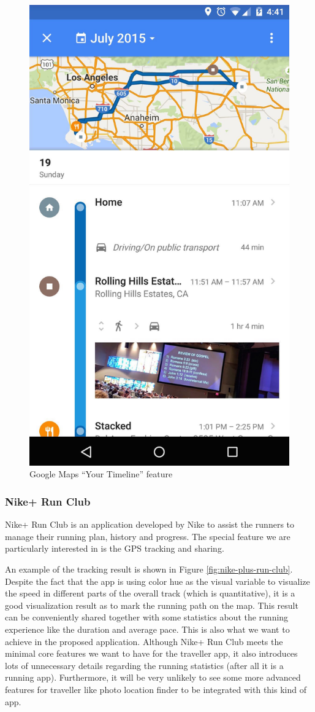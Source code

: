 \documentclass[12pt,a4paper]{article}
\renewcommand\texttt[1]{{\ttfamily\color{textttColor}#1}}
\begin{document}
            \begin{figure}
                \includegraphics[width=.32\textwidth]{1-3-1}
                \centering
                \caption{Google Maps ``Your Timeline'' feature}
                \label{fig:google-maps}
            \end{figure}
            
            \subsubsection{Nike\texttt{+} Run Club}
            \label{intro:comparison:nike}
            Nike\texttt{+} Run Club is an application developed by Nike to assist the runners to manage their running plan, history and progress. The special feature we are particularly interested in is the GPS tracking and sharing.
            
            An example of the tracking result is shown in Figure \ref{fig:nike-plus-run-club}. Despite the fact that the app is using color hue as the visual variable to visualize the speed in different parts of the overall track (which is quantitative), it is a good visualization result as to mark the running path on the map. This result can be conveniently shared together with some statistics about the running experience like the duration and average pace. This is also what we want to achieve in the proposed application. Although Nike\texttt{+} Run Club meets the minimal core features we want to have for the traveller app, it also introduces lots of unnecessary details regarding the running statistics (after all it is a running app). Furthermore, it will be very unlikely to see some more advanced features for traveller like photo location finder to be integrated with this kind of app.
            
\end{document}
